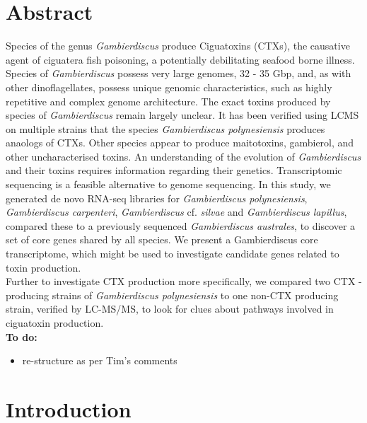 \documentclass[12pt]{article}
\begin{document}
\section*{Abstract}
Species of the genus \textit{Gambierdiscus} produce Ciguatoxins (CTXs), the causative agent of ciguatera fish poisoning, a potentially debilitating seafood borne illness. 
Species of \textit{Gambierdiscus} possess very large genomes, 32 - 35 Gbp, and, as with other dinoflagellates, possess unique genomic characteristics, such as highly repetitive and complex genome architecture. 
The exact toxins produced by species of \textit{Gambierdiscus} remain largely unclear. 
It has been verified using LCMS on multiple strains that the species \textit{Gambierdiscus polynesiensis} produces anaologs of CTXs. 
Other species appear to produce maitotoxins, gambierol, and other uncharacterised toxins. 
An understanding of the evolution of \textit{Gambierdiscus} and their toxins requires information regarding their genetics. 
Transcriptomic sequencing is a feasible alternative to genome sequencing. 
In this study, we generated de novo RNA-seq libraries for \textit{Gambierdiscus polynesiensis}, \textit{Gambierdiscus carpenteri}, \textit{Gambierdiscus} cf. \textit{silvae} and \textit{Gambierdiscus lapillus}, compared these to a previously sequenced \textit{Gambierdiscus australes}, to discover a set of core genes shared by all species. 
We present a Gambierdiscus core transcriptome, which might be used to investigate candidate genes related to toxin production.\\
Further to investigate CTX production more specifically, we compared two CTX -producing strains of \textit{Gambierdiscus polynesiensis} to one non-CTX producing strain, verified by LC-MS/MS, to look for clues about pathways involved in ciguatoxin production.\\
\textbf{To do:}
\begin{itemize}
\item re-structure as per Tim's comments
\end{itemize}

\newpage
\section*{Introduction}
\end{document}
